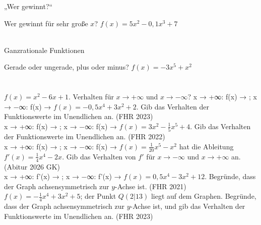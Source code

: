 \setcounter{aufgabe}{9}

\begin{aufgabe}{„Wer gewinnt?“}
\begin{teile}
\teil Wer gewinnt für sehr große $x$? $f(x) = 5x^2 - 0{,}1x^3 + 7$  \\  \\ 
\end{teile}
\end{aufgabe}

\begin{aufgabe}{Ganzrationale Funktionen}
\begin{teile}
\teil Gerade oder ungerade, plus oder minus? $f(x) = -3x^5 + x^2$  \\  \\  \\ 
\teil $f(x) = x^2 - 6x + 1$. Verhalten für $x \to +\infty$ und $x \to -\infty$? x → +∞: f(x) → \leerfeld ; x → −∞: f(x) → \leerfeld
\teil $f(x) = -0{,}5x^4 + 3x^2 + 2$. Gib das Verhalten der Funktionswerte im Unendlichen an. \hfill (FHR 2023) \\ x → +∞: f(x) → \leerfeld ; x → −∞: f(x) → \leerfeld
\teil $f(x) = 3x^2 - \frac{1}{5}x^5 + 4$. Gib das Verhalten der Funktionswerte im Unendlichen an. \hfill (FHR 2022) \\ x → +∞: f(x) → \leerfeld ; x → −∞: f(x) → \leerfeld
\teil $f(x) = \frac{1}{20}x^5 - x^2$ hat die Ableitung $f'(x) = \frac{1}{4}x^4 - 2x$. Gib das Verhalten von $f'$ für $x \to -\infty$ und $x \to +\infty$ an. \hfill (Abitur 2026 GK) \\ x → +∞: f'(x) → \leerfeld ; x → −∞: f'(x) → \leerfeld
\teil $f(x) = 0{,}5x^4 - 3x^2 + 12$. Begründe, dass der Graph achsensymmetrisch zur $y$-Achse ist. \hfill (FHR 2021)
\teil $f(x) = -\frac{1}{4}x^4 + 3x^2 + 5$; der Punkt $Q(2 | 13)$ liegt auf dem Graphen. Begründe, dass der Graph achsensymmetrisch zur $y$-Achse ist, und gib das Verhalten der Funktionswerte im Unendlichen an. \hfill (FHR 2023)
\end{teile}
\end{aufgabe}

